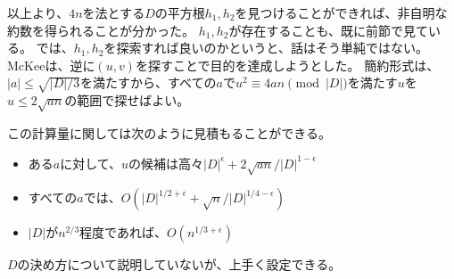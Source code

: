 以上より、$4n$を法とする$D$の平方根$h_1,h_2$を見つけることができれば、非自明な約数を得られることが分かった。
$h_1,h_2$が存在することも、既に前節で見ている。
では、$h_1,h_2$を探索すれば良いのかというと、話はそう単純ではない。
McKeeは、逆に$(u,v)$を探すことで目的を達成しようとした。
簡約形式は、$|a|\le\sqrt{|D|/3}$を満たすから、すべての$a$で$u^2\equiv4an\pmod{|D|}$を満たす$u$を$u\le2\sqrt{an}$の範囲で探せばよい。

この計算量に関しては次のように見積もることができる。
\begin{itemize}
\item ある$a$に対して、$u$の候補は高々$|D|^{\epsilon}+2\sqrt{an}/|D|^{1-\epsilon}$
\item すべての$a$では、$O(|D|^{1/2+\epsilon} + \sqrt{n}/|D|^{1/4-\epsilon})$
\item $|D|$が$n^{2/3}$程度であれば、$O(n^{1/3+\epsilon})$
\end{itemize}

$D$の決め方について説明していないが、上手く設定できる。

